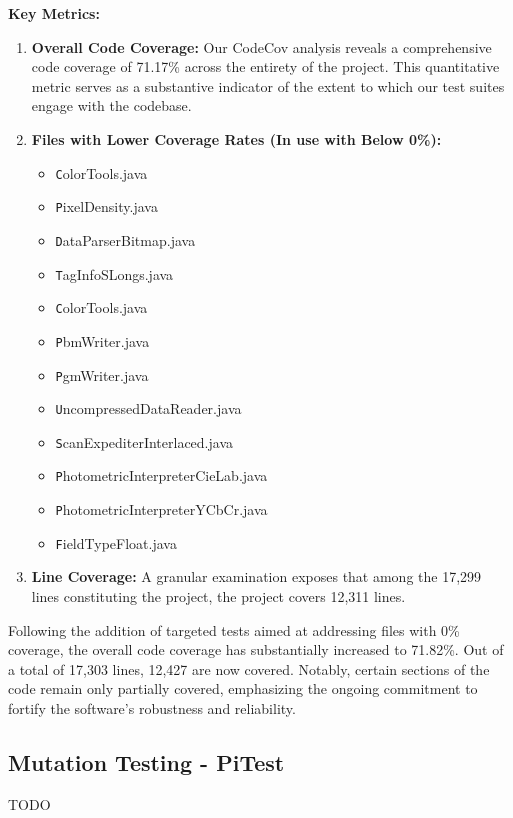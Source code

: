 \documentclass[sigconf]{acmart}
\begin{document}
\textbf{Key Metrics:}
\begin{enumerate}
    \item \textbf{Overall Code Coverage:} Our CodeCov analysis reveals a comprehensive code coverage of 71.17\% across the entirety of the project. This quantitative metric serves as a substantive indicator of the extent to which our test suites engage with the codebase.
    
    \item \textbf{Files with Lower Coverage Rates (In use with Below 0\%):}
    \begin{itemize}
        \item \texttt ColorTools.java
        \item \texttt PixelDensity.java
        \item \texttt DataParserBitmap.java
        \item \texttt TagInfoSLongs.java
        \item \texttt ColorTools.java
        \item \texttt PbmWriter.java
        \item \texttt PgmWriter.java
        \item \texttt UncompressedDataReader.java
        \item \texttt ScanExpediterInterlaced.java
        \item \texttt PhotometricInterpreterCieLab.java
        \item \texttt PhotometricInterpreterYCbCr.java
        \item \texttt FieldTypeFloat.java
    \end{itemize}
    
    \item \textbf{Line Coverage:} A granular examination exposes that among the 17,299 lines constituting the project, the project covers 12,311 lines.
\end{enumerate}

Following the addition of targeted tests aimed at addressing files with 0\% coverage, the overall code coverage has substantially increased to 71.82\%. Out of a total of 17,303 lines, 12,427 are now covered. Notably, certain sections of the code remain only partially covered, emphasizing the ongoing commitment to fortify the software's robustness and reliability.


\subsection{Mutation Testing - PiTest}
TODO
\end{document}
